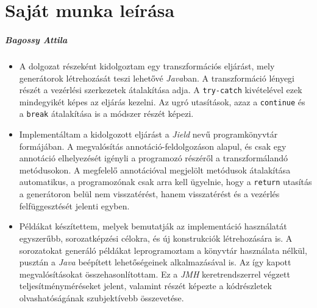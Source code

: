 \chapter*{Saját munka leírása}

\if{}
    \paragraph{Bagossy Attila}
\fi

\begin{itemize}
    \item A dolgozat részeként kidolgoztam egy transzformációs eljárást, mely generátorok létrehozását teszi lehetővé \textit{Java}ban. A transzformáció lényegi részét a vezérlési szerkezetek átalakítása adja. A \texttt{try-catch} kivételével ezek mindegyikét képes az eljárás kezelni. Az ugró utasítások, azaz a \texttt{continue} és a \texttt{break} átalakítása is a módszer részét képezi.
    \item Implementáltam a kidolgozott eljárást a \textit{Jield} nevű programkönyvtár formájában. A megvalósítás annotáció-feldolgozáson alapul, és csak egy annotáció elhelyezését igényli a programozó részéről a transzformálandó metódusokon. A megfelelő annotációval megjelölt metódusok átalakítása automatikus, a programozónak csak arra kell ügyelnie, hogy a \texttt{return} utasítás a generátoron belül nem visszatérést, hanem visszatérést és a vezérlés felfüggesztését jelenti egyben.
    \item Példákat készítettem, melyek bemutatják az implementáció használatát egyszerűbb, sorozatképzési célokra, és új konstrukciók létrehozására is. A sorozatokat generáló példákat leprogramoztam a könyvtár használata nélkül, pusztán a \textit{Java} beépített lehetőségeinek alkalmazásával is. Az így kapott megvalósításokat összehasonlítottam. Ez a \textit{JMH} keretrendszerrel végzett teljesítményméréseket jelent, valamint részét képezte a kódrészletek olvashatóságának szubjektívebb összevetése.
\end{itemize}

